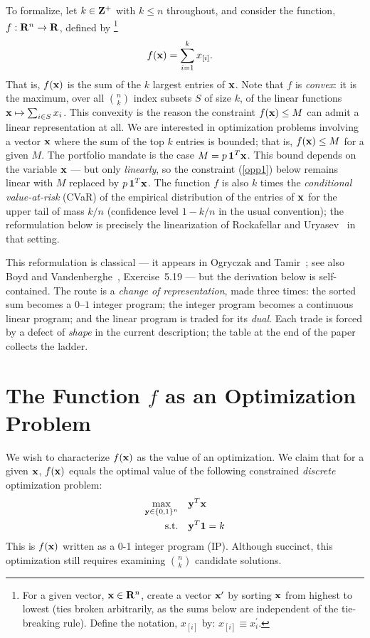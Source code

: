 \documentclass[12pt]{article}
\begin{document}
To formalize, let $k \in {\bf Z}^+$ with $k \le n$ throughout, and
consider the function, $f: {\bf R}^n \to {\bf R}$, defined by%
\footnote{
For a given vector, ${\bf x} \in {\bf R}^n$, create a vector ${\bf x}^\prime$
by sorting ${\bf x}$ from highest to lowest (ties broken arbitrarily, as the
sums below are independent of the tie-breaking rule).
Define the notation, $x_{[i]}$ by: $x_{[i]} \equiv x_{i}^\prime$.}
\begin{align*}
	f({\bf x}) &= \sum_{i=1}^k x_{[i]}.
\end{align*}
That is, $f({\bf x})$ is the sum of the $k$ largest entries of ${\bf x}$.
Note that $f$ is {\it convex\/}: it is the maximum, over all $\binom{n}{k}$
index subsets $S$ of size $k$, of the linear functions
${\bf x} \mapsto \sum_{i \in S} x_i$.  This convexity is the reason the
constraint $f({\bf x}) \le M$ can admit a linear representation at all.
We are interested in optimization problems involving a vector ${\bf x}$
where the sum of the top $k$ entries is bounded; that is, $f({\bf x}) \le M$
for a given $M$.  The portfolio mandate is the case
$M = p \, {\bf 1}^T {\bf x}$.  This bound depends on the variable
${\bf x}$ --- but only {\it linearly\/}, so the constraint (\ref{opp1})
below remains linear with $M$ replaced by $p \, {\bf 1}^T {\bf x}$.
The function $f$ is also $k$ times the
{\it conditional value-at-risk\/} (CVaR) of the empirical distribution of
the entries of ${\bf x}$ for the upper tail of mass $k/n$ (confidence level
$1 - k/n$ in the usual convention); the reformulation below is
precisely the linearization of Rockafellar and
Uryasev~\cite{rockafellar-uryasev} in that setting.

This reformulation is classical --- it appears in Ogryczak and
Tamir~\cite{ogryczak-tamir}; see also Boyd and
Vandenberghe~\cite{boyd}, Exercise~5.19 --- but the derivation below is self-contained.
The route is a {\it change of representation\/}, made three times: the
sorted sum becomes a $0$--$1$ integer program; the integer program
becomes a continuous linear program; and the linear program is traded for
its {\it dual\/}.  Each trade is forced by a defect of {\it shape\/} in
the current description; the table at the end of the paper collects the
ladder.

\section{The Function $f$ as an Optimization Problem}
We wish to characterize $f({\bf x})$ as the value of an optimization.
We claim that for a given ${\bf x}$, $f({\bf x})$ equals the optimal value of
the following constrained {\it discrete\/} optimization problem:%
\begin{align}
	\max_{{\bf y} \in \{0,1\}^n} \quad & {\bf y}^T {\bf x} \label{discrete_objective} \\
	\text{s.t.} \quad & {\bf y}^T {\bf 1} = k \label{discrete_card}
\end{align}
This is $f({\bf x})$ written as a 0-1 integer program (IP).
Although succinct, this optimization still requires examining $\binom{n}{k}$
candidate solutions.
\end{document}
